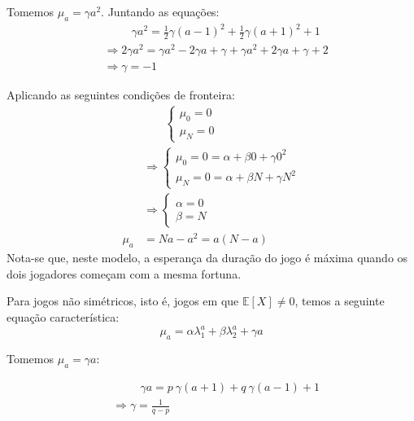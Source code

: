 \documentclass[
  brazilian,
  12pt,
]{article}
\theoremstyle{definition}
\theoremstyle{definition}
\theoremstyle{remark}
\begin{document}
Tomemos \(\mu_{a} = \gamma a^2\). Juntando as equações: \[
\begin{aligned}
& \phantom{\Rightarrow;;}
\gamma a^2 = \frac{1}{2} \gamma (a-1)^2 + \frac{1}{2} \gamma (a+1)^2 + 1 \\
& \Rightarrow 2 \gamma a^2 = \gamma a^2 - 2 \gamma a + \gamma + \gamma a^2 + 2\gamma a + \gamma + 2\\
& \Rightarrow \gamma = -1
\end{aligned}
\]

Aplicando as seguintes condições de fronteira: \[
\begin{aligned}
& \phantom{\Rightarrow \,\,}\begin{cases} \mu_{0} = 0 \\ \mu_{N} = 0 \end{cases} \\
&\Rightarrow
\begin{cases} \mu_{0} = 0 = \alpha + \beta 0 + \gamma 0^2 \\ 
              \mu_{N} = 0 = \alpha + \beta N + \gamma N^2   \end{cases}\\
& \Rightarrow 
\begin{cases} \alpha = 0 \\ 
              \beta  = N  \end{cases} \\
\mu_{a} &=  Na-a^2 = a(N-a)
\end{aligned}
\] Nota-se que, neste modelo, a esperança da duração do jogo é máxima
quando os dois jogadores começam com a mesma fortuna.

Para jogos não simétricos, isto é, jogos em que
\(\mathbb{E}[X] \neq 0\), temos a seguinte equação característica: \[
\mu_{a} = \alpha \lambda_1^a + \beta \lambda_2^a + \gamma a
\]

Tomemos \(\mu_{a} = \gamma a\):

\[
\begin{aligned}
& \phantom{\Rightarrow;;}\gamma a = p \:  \gamma ({a+1}) + q \: \gamma ({a-1}) +1 \\
& \Rightarrow \gamma = \frac{1}{q-p}
\end{aligned}
\]
\end{document}
